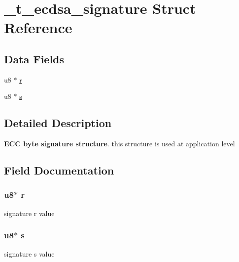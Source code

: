 \hypertarget{struct__t__ecdsa__signature}{\section{\+\_\+t\+\_\+ecdsa\+\_\+signature Struct Reference}
\label{struct__t__ecdsa__signature}
}
\subsection*{Data Fields}
\begin{DoxyCompactItemize}
\item
u8 $\ast$ \hyperlink{struct__t__ecdsa__signature_ad94fd3eb6814b5963e6bc12f2af1fd80}{r}
\item
u8 $\ast$ \hyperlink{struct__t__ecdsa__signature_aa485375cd3a50ab010ae94f44b55ea01}{s}
\end{DoxyCompactItemize}


\subsection{Detailed Description}
{\bfseries E\+C\+C byte signature structure}. this structure is used at application level

\subsection{Field Documentation}
\hypertarget{struct__t__ecdsa__signature_ad94fd3eb6814b5963e6bc12f2af1fd80}{
\subsubsection[{r}]{\setlength{\rightskip}{0pt plus 5cm}u8$\ast$ r}}\label{struct__t__ecdsa__signature_ad94fd3eb6814b5963e6bc12f2af1fd80}
signature r value \hypertarget{struct__t__ecdsa__signature_aa485375cd3a50ab010ae94f44b55ea01}{
\subsubsection[{s}]{\setlength{\rightskip}{0pt plus 5cm}u8$\ast$ s}}\label{struct__t__ecdsa__signature_aa485375cd3a50ab010ae94f44b55ea01}
signature s value 